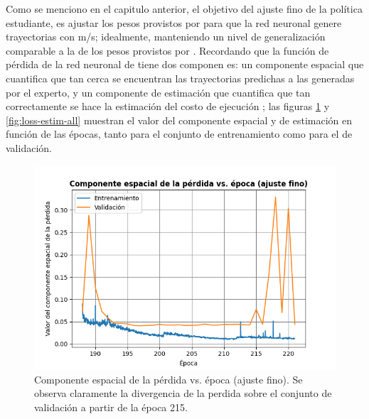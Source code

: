 \label{sec:results-finetune}

Como se menciono en el capitulo anterior, el objetivo del ajuste fino de la política estudiante, es ajustar los pesos provistos por \cite{Loquercio2021} para que la red neuronal genere trayectorias con  m/s; idealmente, manteniendo un nivel de generalización comparable a la de los pesos provistos por \cite{Loquercio2021}. Recordando que la función de pérdida de la red neuronal de \cite{Loquercio2021} tiene dos componen es: un componente espacial que cuantifica que tan cerca se encuentran las trayectorias predichas a las generadas por el experto, y un componente de estimación que cuantifica que tan correctamente se hace la estimación del costo de ejecución ; las figuras \ref{fig:loss-space-all} y \ref{fig:loss-estim-all} muestran el valor del componente espacial y de estimación en función de las épocas, tanto para el conjunto de entrenamiento como para el de validación.

\begin{figure}[H]
    \centering
    \includegraphics[scale=0.65]{partes/ImgJoao/loss-space-all.png}
    \caption[Componente espacial de la pérdida vs. época (ajuste fino).]{Componente espacial de la pérdida vs. época (ajuste fino). Se observa claramente la divergencia de la perdida sobre el conjunto de validación a partir de la época 215.}
    \label{fig:loss-space-all}
\end{figure}

